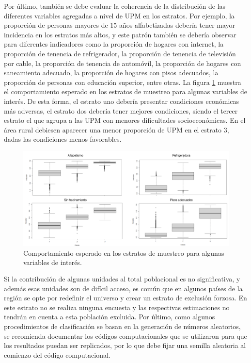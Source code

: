 \documentclass[
  12pt,
  spanish,
]{book}
\begin{document}
Por último, también se debe evaluar la coherencia de la distribución de las diferentes variables agregadas a nivel de UPM en los estratos. Por ejemplo, la proporción de personas mayores de 15 años alfabetizadas debería tener mayor incidencia en los estratos más altos, y este patrón también se debería observar para diferentes indicadores como la proporción de hogares con internet, la proporción de tenencia de refrigerador, la proporción de tenencia de televisión por cable, la proporción de tenencia de automóvil, la proporción de hogares con saneamiento adecuado, la proporción de hogares con pisos adecuados, la proporción de personas con educación superior, entre otras. La figura \ref{fig:estrata} muestra el comportamiento esperado en los estratos de muestreo para algunas variables de interés. De esta forma, el estrato uno debería presentar condiciones económicas más adversas, el estrato dos debería tener mejores condiciones, siendo el tercer estrato el que agrupa a las UPM con menores dificultades socioeconómicas. En el área rural debiesen aparecer una menor proporción de UPM en el estrato 3, dadas las condiciones menos favorables.

\begin{figure}
\includegraphics[width=800px]{Pics/Estratificar} \caption{Comportamiento esperado en los estratos de muestreo para algunas variables de interés.}\label{fig:estrata}
\end{figure}

Si la contribución de algunas unidades al total poblacional es no significativa, y además esas unidades son de difícil acceso, es común que en algunos países de la región se opte por redefinir el universo y crear un estrato de exclusión forzosa. En este estrato no se realiza ninguna encuesta y las respectivas estimaciones no tendrán en cuenta a esta población excluida. Por último, como algunos procedimientos de clasificación se basan en la generación de números aleatorios, se recomienda documentar los códigos computacionales que se utilizaron para que los resultados puedan ser replicados, por lo que debe fijar una semilla aleatoria al comienzo del código computacional.
\end{document}
